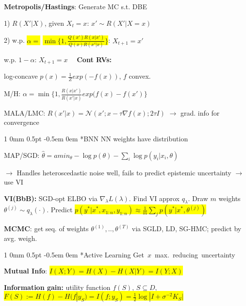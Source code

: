 \documentclass[11pt,landscape,a4paper,fleqn]{article}
\makeatletter
\newcommand*{\rsection}{%
	\@startsection{section}%
	{1}%
	{0mm}%
	{0.5pt}%
	{-0.5em \@plus 0em}
	{\color{myorange}\sffamily\small\bfseries}}
\newcommand{\mhl}[1]{\setlength{\fboxsep}{0pt}\colorbox{yellow}{#1}}
\makeatother
\begin{document}
\begin{multicols*}{4}
		\textbf{Metropolis/Hastings}: Generate MC s.t. DBE

		1) $R(X' | X)$, given $X_t = x$:  $x' \sim R(X' | X=x)$

		2) w.p.  \mhl{$\alpha =$} \mhl{$\min \{ 1, \frac{Q(x')R(x | x')}{Q(x) R(x' | x)}\}$}: $X_{t+1} = x'$

		w.p. $1 - \alpha$: $X_{t+1} = x \quad$
		\textbf{Cont RVs:}

		\vspace*{-1mm}
		log-concave $p(x) = \frac{1}{Z} exp(-f(x))$, $f$ convex.

		\vspace*{-1mm}
		M/H: $\alpha = \min \{ 1, \frac{R(x|x')}{R(x'|x)}exp(f(x) - f(x')\}$

		\vspace*{-1mm}
		MALA/LMC: $R(x' | x) = \mathcal{N}(x'; x - \tau \nabla f(x); 2\tau I)$
	$\rightarrow$ grad. info for convergence

		\vspace*{1mm}
		\rsection*{BNN} NN weights have distribution

			{\fontsize{9}{6}\selectfont MAP/SGD: $\hat{\theta} = amin_\theta -\log p(\theta) - \sum_{i} \log p(y_i | x_i, \theta)$}

	$\rightarrow$ Handles heteroscedastic noise well, fails to predict epistemic uncertainty $\rightarrow$ use VI

		\textbf{VI(BbB):} SGD-opt ELBO via $\nabla_\lambda L(\lambda)$. Find VI approx $q_\lambda$. Draw $m$ weights $\theta^{(j)} \sim q_\lambda(\cdot)$. Predict \mhl{$p(y^* | x^*, x_{1:n}, y_{1:n}) \approx \frac{1}{m} \sum_j p(y^* | x^*, \theta^{(j)})$}

		\textbf{MCMC}: get seq. of weights {\fontsize{9}{6}\selectfont $\theta^{(1)},..,\theta^{(T)}$} via SGLD, LD, SG-HMC; predict by avg. weigh.


		\rsection*{Active Learning}
		{\fontsize{9}{0}\selectfont \mbox{Get $x$ max. reducing uncertainty}}

		\textbf{Mutual Info}: {\fontsize{9.5}{6}\selectfont \mhl{$I(X;Y) = H(X) - H(X | Y) = I(Y;X)$}}


		\textbf{Information gain:} utility function $f(S)$, $S \subseteq D$, \mhl{\fontsize{9}{6}\selectfont $F(S) := H(f) - H(f | y_S) = I(f;y_S) = \frac{1}{2} \log |I + \sigma^{-2} K_S|$}


\end{multicols*}
\end{document}
